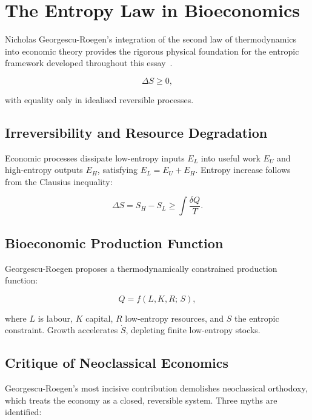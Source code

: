 \documentclass[12pt,a4paper]{article}
\theoremstyle{definition}
\begin{document}
\section{The Entropy Law in Bioeconomics}
\label{sec:georgescu}

Nicholas Georgescu-Roegen's integration of the second law of thermodynamics
into economic theory provides the rigorous physical foundation for the entropic
framework developed throughout this essay~\citep{georgesuroegen1971}.

\begin{equation}
  \Delta S \geq 0,
\end{equation}

with equality only in idealised reversible processes.

\subsection{Irreversibility and Resource Degradation}

Economic processes dissipate low-entropy inputs $E_L$ into useful work $E_U$
and high-entropy outputs $E_H$, satisfying $E_L = E_U + E_H$.  Entropy
increase follows from the Clausius inequality:

\begin{equation}
  \Delta S = S_H - S_L \geq \int \frac{\delta Q}{T}.
\end{equation}

\subsection{Bioeconomic Production Function}

Georgescu-Roegen proposes a thermodynamically constrained production function:

\begin{equation}
  Q = f(L, K, R;\, S),
\end{equation}

where $L$ is labour, $K$ capital, $R$ low-entropy resources, and $S$ the
entropic constraint.  Growth accelerates $\dot{S}$, depleting finite
low-entropy stocks.

\subsection{Critique of Neoclassical Economics}

Georgescu-Roegen's most incisive contribution demolishes neoclassical
orthodoxy, which treats the economy as a closed, reversible system.  Three
myths are identified:
\end{document}
